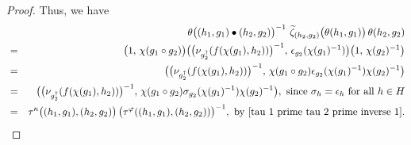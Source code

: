 \documentclass{jonasart}
\theoremstyle{plain}
\begin{document}
\begin{proof}
		Thus, we have
		\begin{eqnarray*}
			&& \theta \big((h_1,g_1)\bullet(h_2,g_2)\big)^{-1} ~  \widetilde{\zeta}_{(h_2,g_2)} \big(\theta(h_1,g_1)\big)\,\theta(h_2,g_2)\\
			&=& \big(1, \,\chi(g_1\circ g_2)\big)\big(\big(\nu_{g_2^\dagger}(f(\chi(g_1),h_2))\big)^{-1}, \, \epsilon_{g_2}(\chi(g_1)^{-1})\big) \big(1, \, \chi(g_2)^{-1}\big)\\
			&=& \big(\big(\nu_{g_2^\dagger}(f(\chi(g_1),h_2))\big)^{-1}, \,\chi(g_1\circ g_2) \epsilon_{g_2}(\chi(g_1)^{-1}) \chi(g_2)^{-1}\big)\\
			&=& \big(\big(\nu_{g_2^\dagger}(f(\chi(g_1),h_2))\big)^{-1}, \,\chi(g_1\circ g_2) \sigma_{g_2}(\chi(g_1)^{-1}) \chi(g_2)^{-1}\big), ~\textrm{since $\sigma_h=\epsilon_h$ for all $h\in H$}\\
			&=& \tau^\kappa \big((h_1,g_1),(h_2,g_2)\big) \, \big(\tau^\varphi((h_1,g_1),(h_2,g_2))\big)^{-1}, ~\textrm{by \eqref{tau 1 prime tau 2 prime inverse 1}}.
		\end{eqnarray*}
		

\end{proof}
\end{document}
